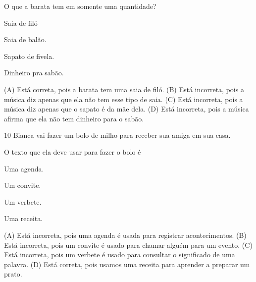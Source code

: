 
O que a barata tem em somente uma quantidade?

\begin{escolha}
\item Saia de filó

\item Saia de balão.

\item Sapato de fivela.

\item Dinheiro pra sabão.
\end{escolha}


(A) Está correta, pois a barata tem uma saia de filó.
(B) Está incorreta, pois a música diz apenas que ela não tem esse tipo de saia.
(C) Está incorreta, pois a música diz apenas que o sapato é da mãe dela.
(D) Está incorreta, pois a música afirma que ela não tem dinheiro para o sabão.

\num{10} Bianca vai fazer um bolo de milho para receber sua amiga em sua casa.

O texto que ela deve usar para fazer o bolo é

\begin{minipage}{.5\textwidth}
\begin{escolha}
\item Uma agenda.

\item Um convite.

\item Um verbete.

\item Uma receita.
\end{escolha}
\end{minipage}

(A) Está incorreta, pois uma agenda é usada para registrar acontecimentos.
(B) Está incorreta, pois um convite é usado para chamar alguém para um evento.
(C) Está incorreta, pois um verbete é usado para consultar o significado de uma palavra.
(D) Está correta, pois usamos uma receita para aprender a preparar um prato.

